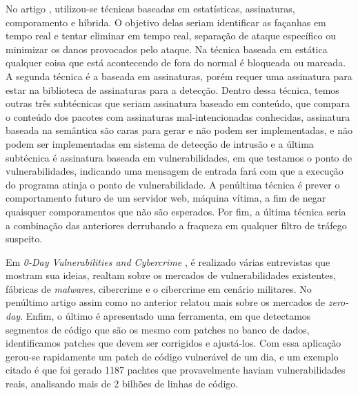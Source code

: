No artigo \cite{Kumar:2016}, utilizou-se técnicas baseadas em estatísticas, assinaturas, comporamento e híbrida. O objetivo delas seriam 
identificar as façanhas em tempo real e tentar eliminar em tempo real, separação de ataque específico ou minimizar os danos provocados 
pelo ataque. Na técnica baseada em estática qualquer coisa que está acontecendo de fora do normal é bloqueada ou marcada. A segunda 
técnica é a baseada em assinaturas, porém requer uma assinatura para estar na biblioteca de assinaturas para a detecção. Dentro dessa 
técnica, temos outras três subtécnicas que seriam assinatura baseado em conteúdo, que compara o conteúdo dos pacotes com assinaturas
mal-intencionadas conhecidas, assinatura baseada na semântica são caras para gerar e não podem ser implementadas, e não podem ser 
implementadas em sistema de detecção de intrusão e a última subtécnica é assinatura baseada em vulnerabilidades, em que testamos o ponto 
de vulnerabilidades, indicando uma mensagem de entrada fará com que a execução do programa atinja o ponto de vulnerabilidade. A penúltima 
técnica é prever o comportamento futuro de um servidor web, máquina vítima, a fim de negar quaisquer comporamentos que não são esperados. 
Por fim, a última técnica seria a combinação das anteriores derrubando a fraqueza em qualquer filtro de tráfego suspeito.

Em \textit{0-Day Vulnerabilities and Cybercrime} \cite{Fotiet:2015}, é realizado várias entrevistas que mostram sua ideias, realtam sobre 
os mercados de vulnerabilidades existentes, fábricas de \textit{malwares}, cibercrime e o cibercrime em cenário militares. No penúltimo 
artigo \cite{Elgeman:2013} assim como no anterior relatou mais sobre os mercados de \textit{zero-day}. Enfim, o último \cite{Luo:2015} é 
apresentado uma ferramenta, em que detectamos segmentos de código que são os mesmo com patches no banco de dados, identificamos patches 
que devem ser corrigidos e ajustá-los. Com essa aplicação gerou-se rapidamente um patch de código vulnerável de um dia, e um exemplo 
citado é que foi gerado 1187 pachtes que provavelmente haviam vulnerabilidades reais, analisando mais de 2 bilhões de linhas de código.

